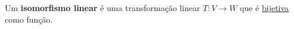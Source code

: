 \begin{definition}
	Um \textbf{isomorfismo linear} é uma transformação linear $T\colon V\to W$ que é \href{http://mtm.ufsc.br/~cordeiro/ensino/mtm3112.algebra.linear/12.trans.lin.inj.sobre/rev_inj_sobre_moodle.html}{bijetiva} como função.
\end{definition}